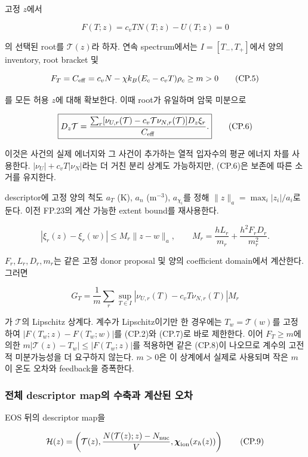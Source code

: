 고정 \(z\)에서

\[
F(T;z)=c_vT N(T;z)-U(T;z)=0
\tag{CP.4}
\]

의 선택된 root를 \(\mathcal T(z)\)라 하자. 연속 spectrum에서는 \(I=[T_-,T_+]\)에서 양의 inventory, root bracket 및

\[
F_T=C_{\rm eff}=c_vN-\chi k_B(E_c-c_vT)\rho_c\ge m>0
\tag{CP.5}
\]

를 모든 허용 \(z\)에 대해 확보한다. 이때 root가 유일하며 암묵 미분으로

\[
\boxed{D_z\mathcal T
=\frac{\sum_r[\nu_{U,r}(\mathcal T)-c_v\mathcal T\nu_{N,r}(\mathcal T)]D_z\xi_r}{C_{\rm eff}}.}
\tag{CP.6}
\]

이것은 사건의 실제 에너지와 그 사건이 추가하는 열적 입자수의 평균 에너지 차를 사용한다. \(|\nu_U|+c_vT|\nu_N|\)라는 더 거친 분리 상계도 가능하지만, (CP.6)은 보존에 따른 소거를 유지한다.

descriptor에 고정 양의 척도 \(a_T\) (K), \(a_n\) (\(\mathrm{m^{-3}}\)), \(a_{\chi_i}\)를 정해 \(\|z\|_a=\max_i|z_i|/a_i\)로 둔다. 이전 FP.23의 계산 가능한 extent bound를 재사용한다.

\[
|\xi_r(z)-\xi_r(w)|\le M_r\|z-w\|_a,\qquad
M_r=\frac{hL_r}{m_r}+\frac{h^2F_rD_r}{m_r^2}.
\tag{CP.7}
\]

\(F_r,L_r,D_r,m_r\)는 같은 고정 donor proposal 및 양의 coefficient domain에서 계산한다. 그러면

\[
G_T=\frac1m\sum_r\sup_{T\in I}|\nu_{U,r}(T)-c_vT\nu_{N,r}(T)|M_r
\tag{CP.8}
\]

가 \(\mathcal T\)의 Lipschitz 상계다. 계수가 Lipschitz이기만 한 경우에는 \(T_w=\mathcal T(w)\)를 고정하여 \(|F(T_w;z)-F(T_w;w)|\)를 (CP.2)와 (CP.7)로 바로 제한한다. 이어 \(F_T\ge m\)에 의한 \(m|\mathcal T(z)-T_w|\le |F(T_w;z)|\)를 적용하면 같은 (CP.8)이 나오므로 계수의 고전적 미분가능성을 더 요구하지 않는다. \(m>0\)은 이 상계에서 실제로 사용되며 작은 \(m\)이 온도 오차와 feedback을 증폭한다.

\hypertarget{uxc804uxccb4-descriptor-mapuxc758-uxc218uxcd95uxacfc-uxacc4uxc0b0uxb41c-uxc624uxcc28}{%
\subsubsection{전체 descriptor map의 수축과 계산된 오차}\label{uxc804uxccb4-descriptor-mapuxc758-uxc218uxcd95uxacfc-uxacc4uxc0b0uxb41c-uxc624uxcc28}}

EOS 뒤의 descriptor map을

\[
\mathcal H(z)=\left(\mathcal T(z),\frac{N(\mathcal T(z);z)-N_{\rm nuc}}V,
\boldsymbol\chi_{\rm ion}(x_h(z))\right)
\tag{CP.9}
\]

